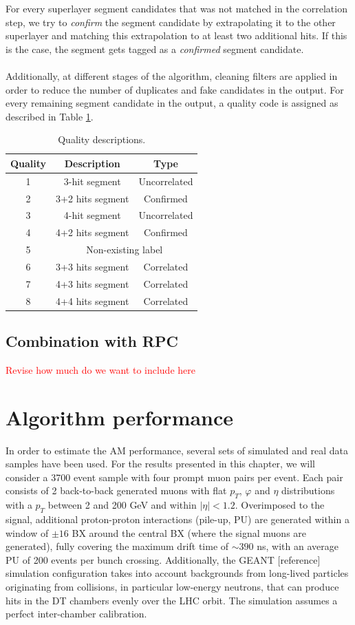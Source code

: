\documentclass[../main.tex]{subfiles}
\begin{document}
For every superlayer segment candidates that was not matched in the correlation step, we try to \textit{confirm} the segment candidate by extrapolating it to the other superlayer and matching this extrapolation to at least two additional hits. If this is the case, the segment gets tagged as a \textit{confirmed} segment candidate.
\\~\\
Additionally, at different stages of the algorithm, cleaning filters are applied in order to reduce the number of duplicates and fake candidates in the output. 
For every remaining segment candidate in the output, a quality code is assigned as described in Table \ref{dts:tab:quality}.

\begin{table}[h!]
	\centering
	\begin{tabular}{c|c|c}
		Quality & Description & Type \\\hline
		1 & 3-hit segment & Uncorrelated \\
		2 & 3+2 hits segment & Confirmed \\
		3 & 4-hit segment & Uncorrelated \\
		4 & 4+2 hits segment & Confirmed \\
		5 & \multicolumn{2}{c}{Non-existing label} \\
		6 & 3+3 hits segment & Correlated \\
		7 & 4+3 hits segment & Correlated \\
		8 & 4+4 hits segment & Correlated
	\end{tabular}
	\caption{Quality descriptions.}
	\label{dts:tab:quality}
\end{table}

\subsection{Combination with RPC}

\textcolor{red}{Revise how much do we want to include here}


\section{Algorithm performance}

In order to estimate the AM performance, several sets of simulated and real data samples have been used. For the results presented in this chapter, we will consider a 3700 event sample with four prompt muon pairs per event. Each pair consists of 2 back-to-back generated muons with flat $p_T$, $\varphi$  and $\eta$ distributions with a $p_T$ between 2 and 200 GeV and within $|\eta|<1.2$. Overimposed to the signal, additional proton-proton interactions (pile-up, PU) are generated within a window of $\pm16$ BX around the central BX (where the signal muons are generated), fully covering the maximum drift time of $\sim390$ ns, with an average PU of 200 events per bunch crossing. Additionally, the GEANT [reference] simulation configuration takes into account backgrounds from long-lived particles originating from collisions, in particular low-energy neutrons, that can produce hits in the DT chambers evenly over the LHC orbit. The simulation assumes a perfect inter-chamber calibration.
\end{document}
